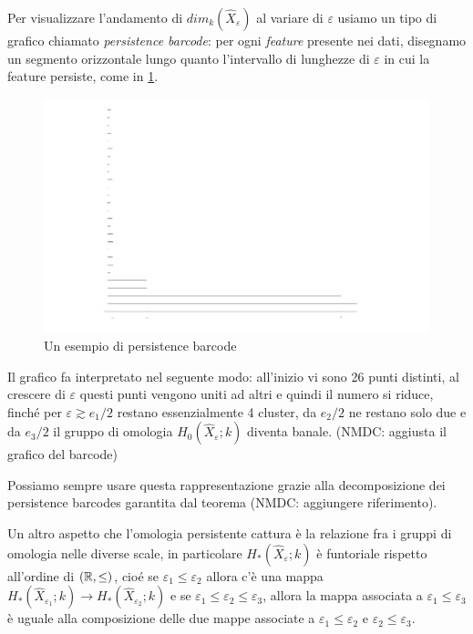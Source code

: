 Per visualizzare l'andamento di $dim_k(\widehat{X}_\varepsilon)$ al variare di $\varepsilon$ usiamo un tipo di grafico chiamato \emph{persistence barcode}: per ogni \emph{feature} presente nei dati, disegnamo un segmento orizzontale lungo quanto l'intervallo di lunghezze di $\varepsilon$ in cui la feature persiste, come in \cref{fig:moreclusterbarcode}.

\begin{figure}[h]
  \includegraphics[width=.7\paperwidth]{gfx/more_clusters_barcodes.pdf}
  \caption{Un esempio di persistence barcode}
  \label{fig:moreclusterbarcode}
\end{figure}

Il grafico fa interpretato nel seguente modo: all'inizio vi sono 26 punti distinti, al crescere di $\varepsilon$ questi punti vengono uniti ad altri e quindi il numero si riduce, finché per $\varepsilon \gtrsim e_1/2$ restano essenzialmente 4 cluster, da $e_2/2$ ne restano solo due e da $e_3/2$ il gruppo di omologia $H_0(\widehat{X}_\varepsilon;k)$ diventa banale. (NMDC: aggiusta il grafico del barcode)

Possiamo sempre usare questa rappresentazione grazie alla decomposizione dei persistence barcodes garantita dal teorema (NMDC: aggiungere riferimento).

Un altro aspetto che l'omologia persistente cattura è la relazione fra i gruppi di omologia nelle diverse scale, in particolare $H_*(\widehat{X}_\varepsilon;k)$ è funtoriale rispetto all'ordine di $(\mathbb{R},\leq)$, cioé se $\varepsilon_1 \leq \varepsilon_2$ allora c'è una mappa $H_*(\widehat{X}_{\varepsilon_1};k)\to H_*(\widehat{X}_{\varepsilon_2};k)$ e se $\varepsilon_1\leq\varepsilon_2\leq\varepsilon_3$, allora la mappa associata a $\varepsilon_1\leq\varepsilon_3$ è uguale alla composizione delle due mappe associate a $\varepsilon_1\leq\varepsilon_2$ e $\varepsilon_2\leq\varepsilon_3$.

